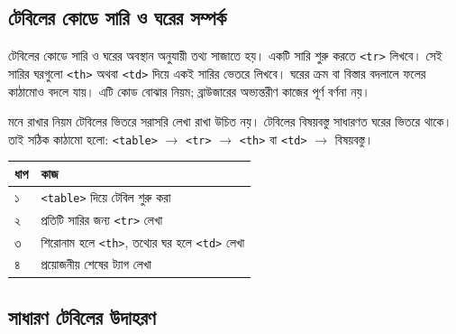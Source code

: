 

\subsection{টেবিলের কোডে সারি ও ঘরের সম্পর্ক}

টেবিলের কোডে সারি ও ঘরের অবস্থান অনুযায়ী তথ্য সাজাতে হয়। একটি সারি শুরু করতে \texttt{<tr>} লিখবে। সেই সারির ঘরগুলো \texttt{<th>} অথবা \texttt{<td>} দিয়ে একই সারির ভেতরে লিখবে। ঘরের ক্রম বা বিস্তার বদলালে ফলের কাঠামোও বদলে যায়। এটি কোড বোঝার নিয়ম; ব্রাউজারের অভ্যন্তরীণ কাজের পূর্ণ বর্ণনা নয়।

\begin{keypointbox}{মনে রাখার নিয়ম}
টেবিলের ভিতরে সরাসরি লেখা রাখা উচিত নয়। টেবিলের বিষয়বস্তু সাধারণত ঘরের ভিতরে থাকে। তাই সঠিক কাঠামো হলো:
\texttt{<table>} $\rightarrow$ \texttt{<tr>} $\rightarrow$ \texttt{<th>} বা \texttt{<td>} $\rightarrow$ বিষয়বস্তু।
\end{keypointbox}

\begin{center}
\begin{tabular}{|p{}|p{}|}
\hline
\textbf{ধাপ} & \textbf{কাজ} \\
\hline
১ & \texttt{<table>} দিয়ে টেবিল শুরু করা \\
\hline
২ & প্রতিটি সারির জন্য \texttt{<tr>} লেখা \\
\hline
৩ & শিরোনাম হলে \texttt{<th>}, তথ্যের ঘর হলে \texttt{<td>} লেখা \\
\hline
৪ & প্রয়োজনীয় শেষের ট্যাগ লেখা \\
\hline
\end{tabular}
\end{center}

\subsection{সাধারণ টেবিলের উদাহরণ}

